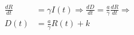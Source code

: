 \documentclass[preview]{standalone}
\begin{document}
\begin{math}
\begin{aligned}
    \frac{dR}{dt} &= \gamma I(t) \Rightarrow \frac{dD}{dt} = \frac{a}{\gamma} \frac{dR}{dt} \Rightarrow \\
    D(t) &= \frac{a}{\gamma} R(t) + k
\end{aligned}
\end{math}

\end{document}
